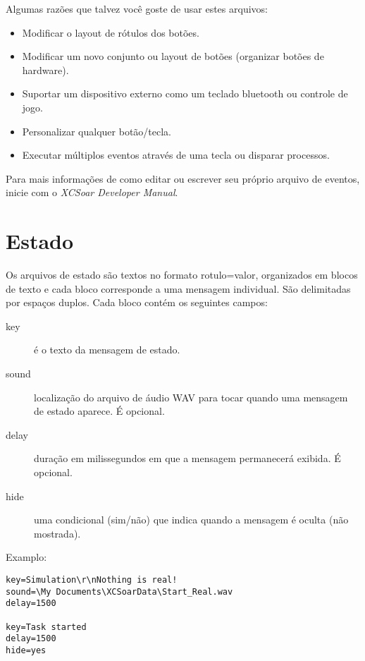 Algumas razões que talvez você goste de usar estes arquivos:

\begin{itemize}
\item Modificar o layout de rótulos dos botões.
\item Modificar um novo conjunto ou layout de botões (organizar botões de hardware).
\item Suportar um dispositivo externo como um teclado bluetooth ou controle de jogo.
\item Personalizar qualquer botão/tecla.
\item Executar múltiplos eventos através de uma tecla ou disparar processos.
\end{itemize}
Para mais informações de como editar ou escrever seu próprio arquivo de eventos, inicie com o {\em XCSoar Developer Manual}.


\section{Estado}\label{sec:status-file}

Os arquivos de estado são textos no formato rotulo=valor, organizados em blocos de texto e cada bloco corresponde a uma mensagem individual.  São delimitadas por espaços duplos.  Cada bloco contém os seguintes campos:
\begin{description}
\item[key]  é o texto da mensagem de estado.
\item[sound] localização do arquivo de áudio WAV para tocar quando uma mensagem de estado aparece.  É opcional.
\item[delay] duração em milissegundos em que a mensagem permanecerá exibida.  É opcional.
\item[hide] uma condicional (sim/não) que indica quando a mensagem é oculta (não mostrada).
\end{description} 

Examplo:
\begin{verbatim}
key=Simulation\r\nNothing is real!
sound=\My Documents\XCSoarData\Start_Real.wav
delay=1500

key=Task started
delay=1500
hide=yes
\end{verbatim}
% 
